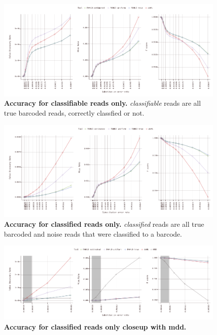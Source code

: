 \documentclass[10pt,twocolumn]{article}
\begin{document}
\begin{figure}[htbp]
\centering
\includegraphics[keepaspectratio,scale=1]{../plot/3_classifiable_accuracy_0550}
\caption{\footnotesize{\textbf{Accuracy for classifiable reads only.} \emph{classifiable} reads are all true barcoded reads, correctly classfied or not.
} }
\label{fig:03}
\end{figure}


\begin{figure}[htbp]
\centering
\includegraphics[keepaspectratio,scale=1]{../plot/5_classified_accuracy_0550}
\caption{\footnotesize{\textbf{Accuracy for classified reads only.} \emph{classified} reads are all true barcoded and noise reads that were classified to a barcode. } }
\label{fig:05}
\end{figure}

\begin{figure}[htbp]
\centering
\includegraphics[keepaspectratio,scale=1]{../plot/6_classified_accuracy_0060_mdd}
\caption{\footnotesize{\textbf{Accuracy for classified reads only closeup with mdd.} } }
\label{fig:06}
\end{figure}
\end{document}
